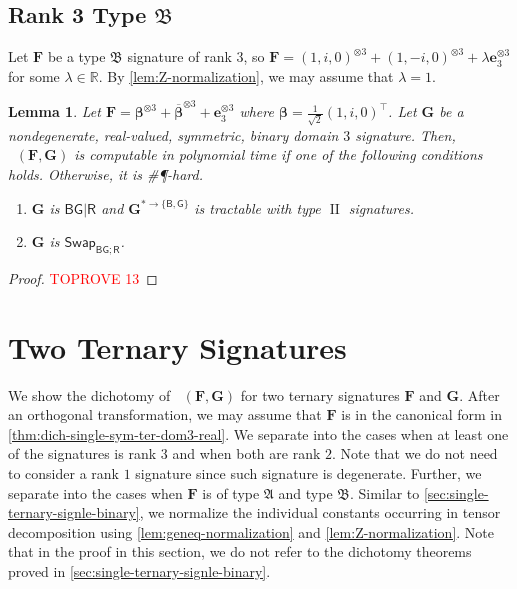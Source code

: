 \documentclass[11pt]{article}
\newtheorem{lemma}[theorem]{Lemma}
\DeclareMathOperator{\holts}{Holant^*_3}
\DeclareMathOperator{\typeii}{II}
\newcommand{\db}{\mathsf{B}}
\newcommand{\dg}{\mathsf{G}}
\newcommand{\dr}{\mathsf{R}}
\newcommand{\swhelper}[1]{$\mathsf{Swap}_{#1}$\xspace}
\newcommand{\swbg}{\swhelper{\db \dg; \dr}}
\newcommand{\sph}{\#\P-hard\xspace}
\newcommand{\teh}{^{\otimes 3}}
\newcommand{\transpose}{^\intercal}
\newcommand{\domres}[1]{
  ^{*\to\{#1\}}
}
\newcommand{\ternarytractgeneq}{$\mathfrak{A}$\xspace}
\newcommand{\ternarytractz}{$\mathfrak{B}$\xspace}
\begin{document}
\subsection{Rank 3 Type \texorpdfstring{\ternarytractz}{B}}
Let $\mathbf{F}$ be a type \ternarytractz signature of rank $3$, so $\mathbf{F} = (1, i, 0)\teh + (1, -i, 0)\teh + \lambda \mathbf{e}_3\teh$ for some $\lambda \in \mathbb{R}$.
By \cref{lem:Z-normalization}, we may assume that $\lambda = 1$.
\begin{lemma}\label{lem:dichotomy-single-ternary-rank-3-z-single-binary}
  Let $\mathbf{F} = \boldsymbol{\beta}\teh + \overline{\boldsymbol{\beta}}\teh + \mathbf{e}_3 \teh$ where $\boldsymbol{\beta} = \frac{1}{\sqrt{2}}(1, i, 0)\transpose$.
  Let $\mathbf{G}$ be a nondegenerate, real-valued, symmetric, binary domain $3$ signature.
  Then, $\holts(\mathbf{F}, \mathbf{G})$ is computable in polynomial time if one of the following conditions holds. Otherwise, it is \sph.
  \begin{enumerate}
    \item $\mathbf{G}$ is $\db \dg | \dr$ and $\mathbf{G}\domres{\db, \dg}$ is tractable with type $\typeii$ signatures.
    \item $\mathbf{G}$ is \swbg.
  \end{enumerate}
\end{lemma}
\begin{proof}\textcolor{red}{TOPROVE 13}\end{proof}
 
\section{Two Ternary Signatures}\label{sec:two-ternary}
We show the dichotomy of $\holts(\mathbf{F}, \mathbf{G})$ for two ternary signatures $\mathbf{F}$ and $\mathbf{G}$.
After an orthogonal transformation, we may assume that $\mathbf{F}$ is in the canonical form in \cref{thm:dich-single-sym-ter-dom3-real}.
We separate into the cases when at least one of the signatures is rank $3$ and when both are rank $2$.
Note that we do not need to consider a rank $1$ signature since such signature is degenerate.
Further, we separate into the cases when $\mathbf{F}$ is of type \ternarytractgeneq and type \ternarytractz.
Similar to \cref{sec:single-ternary-signle-binary}, we normalize the individual constants occurring in tensor decomposition using \cref{lem:geneq-normalization} and \cref{lem:Z-normalization}. 
Note that in the proof in this section, we do not refer to the dichotomy theorems proved in \cref{sec:single-ternary-signle-binary}.
\end{document}
